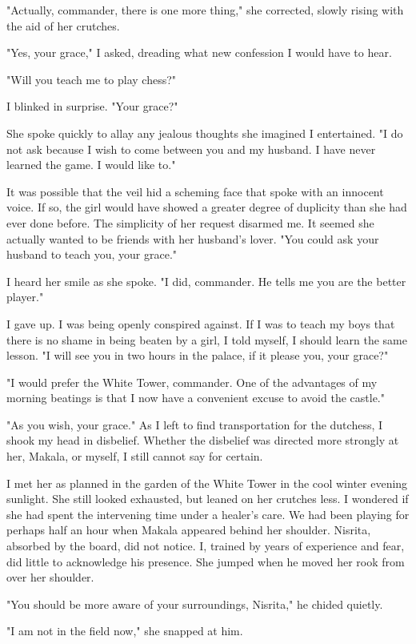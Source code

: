 \documentclass{article}
\begin{document}
"Actually, commander, there is one more thing," she corrected, slowly rising with the aid of her crutches. 

"Yes, your grace," I asked, dreading what new confession I would have to hear.

"Will you teach me to play chess?"

I blinked in surprise. "Your grace?"

She spoke quickly to allay any jealous thoughts she imagined I entertained. "I do not ask because I wish to come between you and my husband. I have never learned the game. I would like to."

It was possible that the veil hid a scheming face that spoke with an innocent voice. If so, the girl would have showed a greater degree of duplicity than she had ever done before. The simplicity of her request disarmed me. It seemed she actually wanted to be friends with her husband's lover. "You could ask your husband to teach you, your grace."

I heard her smile as she spoke. "I did, commander. He tells me you are the better player."

I gave up. I was being openly conspired against. If I was to teach my boys that there is no shame in being beaten by a girl, I told myself, I should learn the same lesson. "I will see you in two hours in the palace, if it please you, your grace?"

"I would prefer the White Tower, commander. One of the advantages of my morning beatings is that I now have a convenient excuse to avoid the castle."

"As you wish, your grace." As I left to find transportation for the dutchess, I shook my head in disbelief. Whether the disbelief was directed more strongly at 
her, Makala, or myself, I still cannot say for certain.

I met her as planned in the garden of the White Tower in the cool winter evening sunlight. She still looked exhausted, but leaned on her crutches less. I wondered if she had spent the intervening time under a healer's care. We had been playing for perhaps half an hour when Makala appeared behind her shoulder. Nisrita, absorbed by the board, did not notice. I, trained by years of experience and fear, did little to acknowledge his presence. She jumped when he moved her rook from over her shoulder. 

"You should be more aware of your surroundings, Nisrita," he chided quietly.

"I am not in the field now," she snapped at him.
\end{document}
